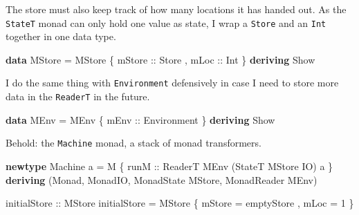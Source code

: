 \documentclass[]{article}
\newenvironment{Shaded}{}{}
\newcommand{\KeywordTok}[1]{\textcolor[rgb]{0.00,0.44,0.13}{\textbf{{#1}}}}
\newcommand{\DataTypeTok}[1]{\textcolor[rgb]{0.56,0.13,0.00}{{#1}}}
\newcommand{\DecValTok}[1]{\textcolor[rgb]{0.25,0.63,0.44}{{#1}}}
\newcommand{\OtherTok}[1]{\textcolor[rgb]{0.00,0.44,0.13}{{#1}}}
\newcommand{\FunctionTok}[1]{\textcolor[rgb]{0.02,0.16,0.49}{{#1}}}
\newcommand{\NormalTok}[1]{{#1}}
\begin{document}
The store must also keep track of how many locations it has handed out.
As the \texttt{StateT} monad can only hold one value as state, I wrap a
\texttt{Store} and an \texttt{Int} together in one data type.

\begin{Shaded}
\begin{Highlighting}[]
\KeywordTok{data} \DataTypeTok{MStore} \FunctionTok{=} \DataTypeTok{MStore} \NormalTok{\{}\OtherTok{ mStore ::} \DataTypeTok{Store}
                     \NormalTok{,}\OtherTok{ mLoc   ::} \DataTypeTok{Int}
                     \NormalTok{\}}
    \KeywordTok{deriving} \DataTypeTok{Show}
\end{Highlighting}
\end{Shaded}

I do the same thing with \texttt{Environment} defensively in case I need
to store more data in the \texttt{ReaderT} in the future.

\begin{Shaded}
\begin{Highlighting}[]
\KeywordTok{data} \DataTypeTok{MEnv} \FunctionTok{=} \DataTypeTok{MEnv} \NormalTok{\{}\OtherTok{ mEnv ::} \DataTypeTok{Environment} \NormalTok{\}}
    \KeywordTok{deriving} \DataTypeTok{Show}
\end{Highlighting}
\end{Shaded}

Behold: the \texttt{Machine} monad, a stack of monad transformers.

\begin{Shaded}
\begin{Highlighting}[]
\KeywordTok{newtype} \DataTypeTok{Machine} \NormalTok{a }\FunctionTok{=} \DataTypeTok{M} \NormalTok{\{}\OtherTok{ runM ::} \DataTypeTok{ReaderT} \DataTypeTok{MEnv} \NormalTok{(}\DataTypeTok{StateT} \DataTypeTok{MStore} \DataTypeTok{IO}\NormalTok{) a \}}
    \KeywordTok{deriving} \NormalTok{(}\DataTypeTok{Monad}\NormalTok{, }\DataTypeTok{MonadIO}\NormalTok{, }\DataTypeTok{MonadState} \DataTypeTok{MStore}\NormalTok{, }\DataTypeTok{MonadReader} \DataTypeTok{MEnv}\NormalTok{)}
\end{Highlighting}
\end{Shaded}

\begin{Shaded}
\begin{Highlighting}[]
\OtherTok{initialStore ::} \DataTypeTok{MStore}
\NormalTok{initialStore }\FunctionTok{=} \DataTypeTok{MStore} \NormalTok{\{ mStore }\FunctionTok{=} \NormalTok{emptyStore}
                      \NormalTok{, mLoc   }\FunctionTok{=} \DecValTok{1}
                      \NormalTok{\}}
\end{Highlighting}
\end{Shaded}
\end{document}
